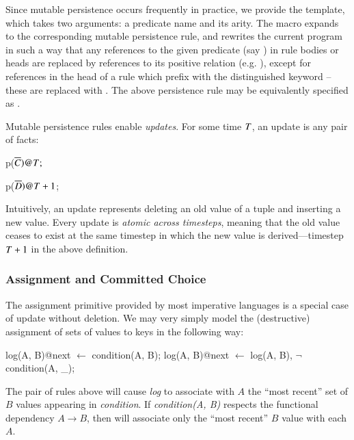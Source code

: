 Since mutable persistence occurs frequently in practice, we provide the
 template, which takes two arguments: a predicate name and
its arity.  The macro expands to the corresponding mutable persistence rule,
and rewrites the current program in such a way that any references to the given
predicate (say ) in rule bodies or heads are replaced by references
to its positive relation (e.g. ), except for references in the
head of a rule which prefix  with the distinguished 
keyword -- these are replaced with .  The above
 persistence rule may be equivalently specified as
.

Mutable persistence rules enable {\em updates}.  For some time $\DT$, an update
is any pair of facts:

\begin{dedalus}
p\nega($\overline{C})@\DT;$
\end{dedalus}

\begin{dedalus}
p\pos($\overline{D})@\DT+1$;
\end{dedalus}


\noindent Intuitively, an update represents deleting an old value of a tuple
and inserting a new value.  Every update is {\em atomic across timesteps},
meaning that the old value ceases to exist at the same timestep in which the
new value is derived---timestep $\DT+1$ in the above definition.

\subsubsection{Assignment and Committed Choice}

The assignment primitive provided by most imperative languages is a special
case of update without deletion.  We may very simply model the (destructive)
assignment of sets of values to keys in the following way:

\begin{Dedalus}
log(A, B)@next \(\leftarrow\) condition(A, B);
log(A, B)@next \(\leftarrow\) log(A, B), \(\lnot\)condition(A, _);
\end{Dedalus}

The pair of rules above will cause {\em log} to associate with $A$ the ``most
recent'' set of $B$ values appearing in {\em condition}.  If {\em condition(A,
B)} respects the functional dependency $A \to B$, then  will
associate only the ``most recent'' $B$ value with each $A$.

